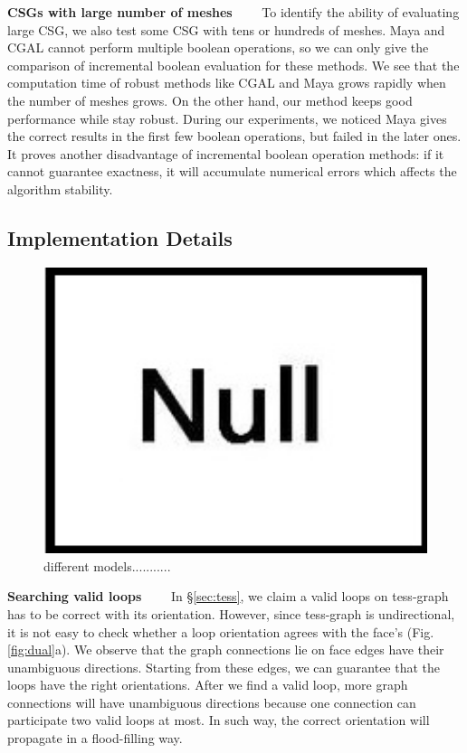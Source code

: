 \documentclass[10pt,journal,compsoc]{IEEEtran}
\begin{document}
\vspace{0.5em}
\noindent\textbf{CSGs with large number of meshes}~~~~
To identify the ability of evaluating large CSG, we also test some CSG with tens or hundreds of meshes. Maya and CGAL cannot perform multiple boolean operations, so we can only give the comparison of incremental boolean evaluation for these methods. We see that the computation time of robust methods like CGAL and Maya grows rapidly when the number of meshes grows. On the other hand, our method keeps good performance while stay robust. During our experiments, we noticed Maya gives the correct results in the first few boolean operations, but failed in the later ones. It proves another disadvantage of incremental boolean operation methods: if it cannot guarantee exactness, it will accumulate numerical errors which affects the algorithm stability.


\subsection{Implementation Details}


\begin{figure}[!t]
\centering
\includegraphics[width=7in]{null}
\caption{different models...........}
\label{fig:models}
\end{figure}

\vspace{0.5em}
\noindent\textbf{Searching valid loops}~~~~ In \S\ref{sec:tess}, we claim a valid loops on tess-graph has to be correct with its orientation. However, since tess-graph is undirectional, it is not easy to check whether a loop orientation agrees with the face's (Fig. \ref{fig:dual}a). We observe that the graph connections lie on face edges have their unambiguous directions. Starting from these edges, we can guarantee that the loops have the right orientations. After we find a valid loop, more graph connections will have unambiguous directions because one connection can participate two valid loops at most. In such way, the correct orientation will propagate in a flood-filling way.
\end{document}
